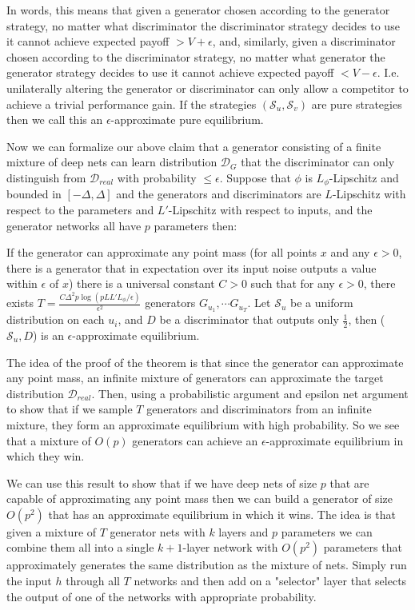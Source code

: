 In words, this means that given a generator chosen according to the generator strategy, no matter what discriminator the discriminator strategy decides to use it cannot achieve expected payoff $> V + \epsilon$, and, similarly, given a discriminator chosen according to the discriminator strategy, no matter what generator the generator strategy decides to use it cannot achieve expected payoff $< V - \epsilon$. I.e. unilaterally altering the generator or discriminator can only allow a competitor to achieve a trivial performance gain. If the strategies $(\mathcal{S}_u, \mathcal{S}_v)$ are pure strategies then we call this an $\epsilon$-approximate pure equilibrium.

Now we can formalize our above claim that a generator consisting of a finite mixture of deep nets can learn distribution $\mathcal{D}_G$ that the discriminator can only distinguish from $\mathcal{D}_{real}$ with probability $\leq \epsilon$. Suppose that $\phi$ is $L_\phi$-Lipschitz and bounded in $[-\Delta, \Delta]$ and the generators and discriminators are $L$-Lipschitz with respect to the parameters and $L'$-Lipschitz with respect to inputs, and the generator networks all have $p$ parameters then:

\begin{theorem}
If the generator can approximate any point mass (for all points $x$ and any $\epsilon > 0$, there is a generator that in expectation over its input noise outputs a value within $\epsilon$ of $x$) there is a universal constant $C > 0$ such that for any $\epsilon > 0$, there exists $T = \frac{C\Delta^2 p \log(p L L' L_\phi / \epsilon)}{\epsilon^2}$ generators $G_{u_1}, \cdots G_{u_T}$. Let $\mathcal{S}_u$ be a uniform distribution on each $u_i$, and $D$ be a discriminator that outputs only $\frac{1}{2}$, then ($\mathcal{S}_u, D$) is an $\epsilon$-approximate equilibrium.
\label{thm:gen}
\end{theorem}

The idea of the proof of the theorem is that since the generator can approximate any point mass, an infinite mixture of generators can approximate the target distribution $\mathcal{D}_{real}$. Then, using a probabilistic argument and epsilon net argument to show that if we sample $T$ generators and discriminators from an infinite mixture, they form an approximate equilibrium with high probability. So we see that a mixture of $O(p)$ generators can achieve an $\epsilon$-approximate equilibrium in which they win.

We can use this result to show that if we have deep nets of size $p$ that are capable of approximating any point mass then we can build a generator of size $O(p^2)$ that has an approximate equilibrium in which it wins. The idea is that given a mixture of $T$ generator nets with $k$ layers and $p$ parameters we can combine them all into a single $k+1$-layer network with $O(p^2)$ parameters that approximately generates the same distribution as the mixture of nets. Simply run the input $h$ through all $T$ networks and then add on a "selector" layer that selects the output of one of the networks with appropriate probability.

